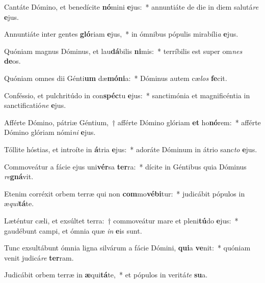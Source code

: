 \item Cantáte Dómino, et benedícite \textbf{nó}mini \textbf{e}jus:~* annuntiáte de die in diem salutá\textit{re} \textbf{e}jus.
\item Annuntiáte inter gentes \textbf{gló}riam \textbf{e}jus,~* in ómnibus pópulis mirabíli\textit{a} \textbf{e}jus.
\item Quóniam magnus Dóminus, et lau\textbf{dá}bilis \textbf{ni}mis:~* terríbilis est super om\textit{nes} \textbf{de}os.
\item Quóniam omnes dii Génti\textbf{um} dæ\textbf{mó}\textbf{ni}a:~* Dóminus autem cæ\textit{los} \textbf{fe}cit.
\item Conféssio, et pulchritúdo in con\textbf{spéc}tu \textbf{e}jus:~* sanctimónia et magnificéntia in sanctificatió\textit{ne} \textbf{e}jus.
\item Afférte Dómino, pátriæ Géntium,~† afférte Dómino glóriam \textbf{et} ho\textbf{nó}rem:~* afférte Dómino glóriam nómi\textit{ni} \textbf{e}jus.
\item Tóllite hóstias, et introíte in \textbf{á}tria \textbf{e}jus:~* adoráte Dóminum in átrio sanc\textit{to} \textbf{e}jus.
\item Commoveátur a fácie ejus uni\textbf{vér}sa \textbf{ter}ra:~* dícite in Géntibus quia Dóminus \textit{re}\textbf{gná}vit.
\item Etenim corréxit orbem terræ qui non \textbf{com}mo\textbf{vé}\textbf{bi}tur:~* judicábit pópulos in æ\textit{qui}\textbf{tá}te.
\item Læténtur cæli, et exsúltet terra:~† commoveátur mare et pleni\textbf{tú}do \textbf{e}jus:~* gaudébunt campi, et ómnia quæ \textit{in} \textbf{e}is sunt.
\item Tunc exsultábunt ómnia ligna silvárum a fácie Dómini, \textbf{qui}a \textbf{ve}nit:~* quóniam venit judicá\textit{re} \textbf{ter}ram.
\item Judicábit orbem terræ in \textbf{æ}qui\textbf{tá}te,~* et pópulos in veritá\textit{te} \textbf{su}a.
